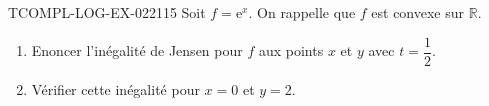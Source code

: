 \begin{exercice}{TCOMPL-LOG-EX-022}{1}{15}
Soit $f = \mathrm{e}^x$. On rappelle que $f$ est convexe sur $\mathbb{R}$.
\begin{enumerate}
  \item Enoncer l'inégalité de Jensen pour $f$ aux points $x$ et $y$ avec $t = \dfrac{1}{2}$.
  \item Vérifier cette inégalité pour $x = 0$ et $y = 2$.
\end{enumerate}

\end{exercice}
